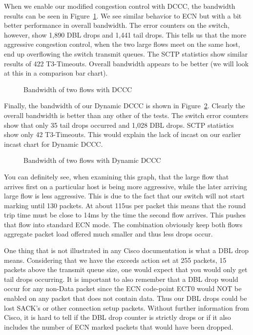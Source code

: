 \documentclass[12pt]{article}
\begin{document}

\newpage

When we enable our modified congestion control with DCCC, the bandwidth results can
be seen in Figure~\ref{fig:dcccBw}.  We see similar behavior to ECN but with a bit better performance in
overall bandwidth. The error counters on the switch, however,
show 1,890 DBL drops and 1,441 tail drops. This tells us that  the more aggressive congestion
control, when the two large flows meet on the same host, end up overflowing the switch
transmit queues. The SCTP statistics show similar results of 422 T3-Timeouts. Overall bandwidth
appears to be better (we will look at this in a comparison bar chart).


\begin{figure}[h]
\centering
{}
\caption{Bandwidth of two flows with DCCC}
\label{fig:dcccBw}
\end{figure}


\newpage

Finally, the bandwidth of our Dynamic DCCC is shown in Figure~\ref{fig:dynBw}. Clearly the
overall bandwidth is better than any other of the tests. The switch error counters show that only 35 tail
drops occurred and 1,028 DBL drops. SCTP statistics show only 42 T3-Timeouts. This would explain
the lack of incast on our earlier incast chart for Dynamic DCCC.

\begin{figure}[h]
\centering
{}
\caption{Bandwidth of two flows with Dynamic DCCC}
\label{fig:dynBw}
\end{figure}


You can definitely see, when examining this graph, that the large flow that arrives first on a particular
host is being more aggressive, while the later arriving large flow is less aggressive. This is due to
the fact that our switch will not start marking until 130 packets. At about 115us per packet this means
that the round trip time must be close to 14ms by the time the second flow arrives. This pushes that
flow into standard ECN mode. The combination obviously keep both flows aggregate packet load
offered much smaller and thus less drops occur.

One thing that is not illustrated in any Cisco documentation is what a DBL drop means. Considering
that we have the exceeds action set at 255 packets, 15 packets above the transmit queue size, one
would expect that you would only get tail drops occurring.  It is important to also remember that a DBL 
drop would occur for any non-Data packet since the ECN code-point ECT0 would NOT be enabled on any packet that
does not contain data. Thus our DBL drops could be lost SACK's or other connection setup packets.
Without further information from Cisco, it is hard to tell if the DBL drop counter is strictly drops or
if it also includes the number of ECN marked packets that would have been dropped.
\end{document}
